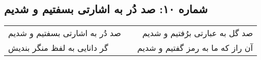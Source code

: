 \begin{center}
\section*{شماره ۱۰: صد دُر به اشارتی بسفتیم و شدیم}
\label{sec:010}
\begin{longtable}{l p{0.5cm} r}
صد دُر به اشارتی بسفتیم و شدیم
&&
صد گل به عبارتی برُفتیم و شدیم
\\
گر دانایی به لفظ منگر بندیش
&&
آن راز که ما به رمز گفتیم و شدیم
\\
\end{longtable}
\end{center}
